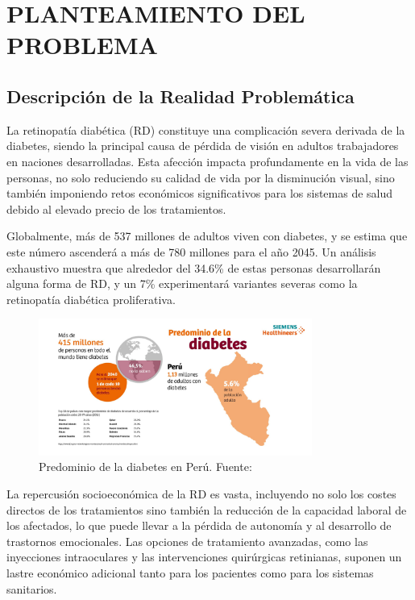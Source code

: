 \chapter{PLANTEAMIENTO DEL PROBLEMA}
\section{Descripción de la Realidad Problemática}

La retinopatía diabética (RD) constituye una complicación severa derivada de la diabetes, siendo la principal causa de pérdida de visión en adultos trabajadores en naciones desarrolladas. Esta afección impacta profundamente en la vida de las personas, no solo reduciendo su calidad de vida por la disminución visual, sino también imponiendo retos económicos significativos para los sistemas de salud debido al elevado precio de los tratamientos.

Globalmente, más de 537 millones de adultos viven con diabetes, y se estima que este número ascenderá a más de 780 millones para el año 2045. Un análisis exhaustivo muestra que alrededor del 34.6\% de estas personas desarrollarán alguna forma de RD, y un 7\% experimentará variantes severas como la retinopatía diabética proliferativa.

\begin{figure}[h]
    \centering
    \includegraphics[width=0.8\textwidth]{images_repo/Predominiodeladiabetes.jpg}
    \caption{Predominio de la diabetes en Perú. Fuente: \cite{idf2021}}
    \label{fig:diabetes_peru}
\end{figure}

La repercusión socioeconómica de la RD es vasta, incluyendo no solo los costes directos de los tratamientos sino también la reducción de la capacidad laboral de los afectados, lo que puede llevar a la pérdida de autonomía y al desarrollo de trastornos emocionales. Las opciones de tratamiento avanzadas, como las inyecciones intraoculares y las intervenciones quirúrgicas retinianas, suponen un lastre económico adicional tanto para los pacientes como para los sistemas sanitarios.

